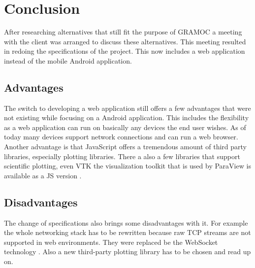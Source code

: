 \chapter{Conclusion}
After researching alternatives that still fit the purpose of GRAMOC a meeting with the client was arranged to discuss these alternatives. This meeting resulted in redoing the specifications of the project. This now includes a web application instead of the mobile Android application.

\section{Advantages}
The switch to developing a web application still offers a few advantages that were not existing while focusing on a Android application. This includes the flexibility as a web application can run on basically any devices the end user wishes. As of today many devices support network connections and can run a web browser. Another advantage is that JavaScript offers a tremendous amount of third party libraries, especially plotting libraries. There a also a few libraries that support scientific plotting, even VTK the visualization toolkit that is used by ParaView is available as a JS version \cite{VTK}.

\section{Disadvantages}
The change of specifications also brings some disadvantages with it. For example the whole networking stack has to be rewritten because raw TCP streams are not supported in web environments. They were replaced be the WebSocket technology \cite{rfc6455}. Also a new third-party plotting library has to be chosen and read up on.
